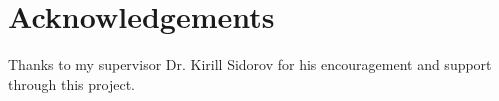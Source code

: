 \section*{Acknowledgements}
\begin{center}
Thanks to my supervisor Dr. Kirill Sidorov for his encouragement and support through this project.
\end{center}
